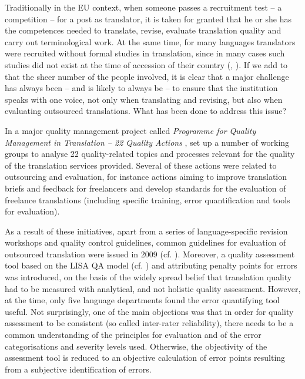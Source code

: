 \documentclass[output=paper]{langsci/langscibook}
\begin{document}
Traditionally in the EU context, when someone passes a recruitment test – a competition – for a post as translator, it is taken for granted that he or she has the competences needed to translate, revise, evaluate translation quality and carry out terminological work. At the same time, for many languages translators were recruited without formal studies in translation, since in many cases such studies did not exist at the time of accession of their country (\citealt{Biel2011}, \citealt{Strandvik2014}). If we add to that the sheer number of the people involved, it is clear that a major challenge has always been – and is likely to always be – to ensure that the institution speaks with one voice, not only when translating and revising, but also when evaluating outsourced translations. What has been done to address this issue?

In a major quality management project called \textit{Programme for Quality Management in Translation – 22 Quality Actions} \citep{DGT2009}, \citeauthor{DGT2009} set up a number of working groups to analyse 22 quality-related topics and processes relevant for the quality of the translation services provided. Several of these actions were related to outsourcing and evaluation, for instance actions aiming to improve translation briefs and feedback for freelancers and develop standards for the evaluation of freelance translations (including specific training, error quantification and tools for evaluation).

As a result of these initiatives, apart from a series of language-specific revision workshops and quality control guidelines, common guidelines for evaluation of outsourced translation were issued in 2009 (cf. \citealt{DGT2013}). Moreover, a quality assessment tool based on the LISA QA model (cf. \citealt{Doherty2013}) and attributing penalty points for errors was introduced, on the basis of the widely spread belief that translation quality had to be measured with analytical, and not holistic quality assessment. However, at the time, only five language departments found the error quantifying tool useful. Not surprisingly, one of the main objections was that in order for quality assessment to be consistent (so called inter-rater reliability), there needs to be a common understanding of the principles for evaluation and of the error categorisations and severity levels used. Otherwise, the objectivity of the assessment tool is reduced to an objective calculation of error points resulting from a subjective identification of errors.
\end{document}
